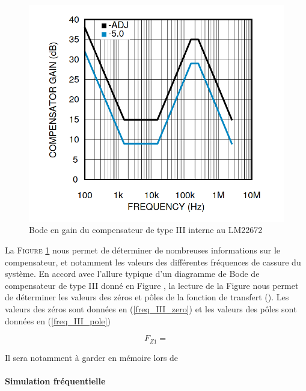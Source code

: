 				\begin{figure}[h]
					\begin{center}
						\includegraphics[scale=0.4]{../Illus/comp_gain.png}
					\end{center}
					\vspace{-2em}
					\caption{Bode en gain du compensateur de type III interne au LM22672 \cite{LM22672}}
					\label{comp_gain}
				\end{figure}
					
				La \textsc{Figure \ref{comp_gain}} nous permet de déterminer de 
				nombreuses informations sur le compensateur, et notamment les 
				valeurs des différentes fréquences de cassure du système. En accord
				avec l'allure typique d'un diagramme de Bode de compensateur de 
				type III donné en Figure , la lecture de la Figure nous permet de 
				déterminer les valeurs des zéros et pôles de la fonction de 
				transfert (). Les valeurs des zéros sont données en 
				(\ref{freq_III_zero}) et les valeurs des pôles sont données en 
				(\ref{freq_III_pole})
										
				\begin{equation}
					F_{Z1} = 
					\label{freq_III_zero}
				\end{equation}
				
				Il sera notamment à garder en mémoire lors de 
					
				\paragraph{Simulation fréquentielle}  
					
